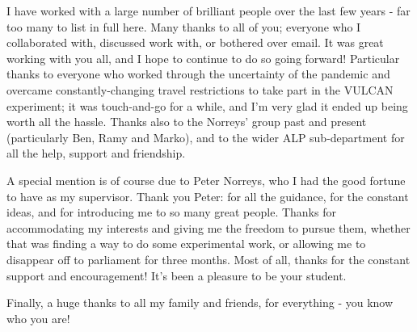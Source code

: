 
I have worked with a large number of brilliant people over the last few years - far too many to list in full here. Many thanks to all of you; everyone who I collaborated with, discussed work with, or bothered over email. It was great working with you all, and I hope to continue to do so going forward! Particular thanks to everyone who worked through the uncertainty of the pandemic and overcame constantly-changing travel restrictions to take part in the VULCAN experiment; it was touch-and-go for a while, and I'm very glad it ended up being worth all the hassle. Thanks also to the Norreys' group past and present (particularly Ben, Ramy and Marko), and to the wider ALP sub-department for all the help, support and friendship.

A special mention is of course due to Peter Norreys, who I had the good fortune to have as my supervisor. Thank you Peter: for all the guidance, for the constant ideas, and for introducing me to so many great people. Thanks for accommodating my interests and giving me the freedom to pursue them, whether that was finding a way to do some experimental work, or allowing me to disappear off to parliament for three months. Most of all, thanks for the constant support and encouragement! It's been a pleasure to be your student.

Finally, a huge thanks to all my family and friends, for everything - you know who you are!


